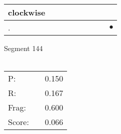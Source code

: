 \documentclass[landscape]{article}
\newcommand{\ssp}{\hspace{2pt}}
\newcommand{\mex}{\cellcolor{g}$\bullet$}
\begin{document}
\begin{tabular}{|l|p{10pt}|p{10pt}|p{10pt}|p{10pt}|p{10pt}|p{10pt}|p{10pt}|p{10pt}|}
\hline
\ssp clockwise \ssp&\hspace{2pt}&\hspace{2pt}&\hspace{2pt}&\hspace{2pt}&\hspace{2pt}&\hspace{2pt}&\hspace{2pt}&\hspace{2pt}\\
\hline
\ssp \cellcolor{ref7}. \ssp&\hspace{2pt}&\hspace{2pt}&\hspace{2pt}&\hspace{2pt}&\hspace{2pt}&\hspace{2pt}&\hspace{2pt}&\hspace{2pt}\mex\\
\hline
\end{tabular}

\vspace{6pt}
\noindent Segment 144\\\\
\noindent\begin{tabular}{lm{12pt}r}
\hline
P:&&0.150\\
R:&&0.167\\
Frag:&&0.600\\
Score:&&0.066\\
\end{tabular}

\newpage
\end{document}
